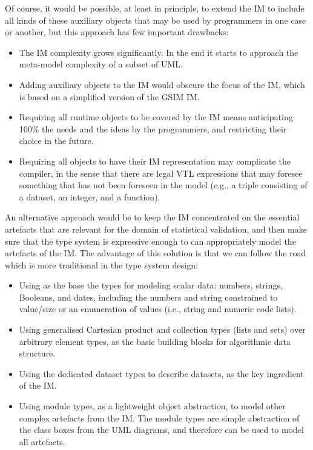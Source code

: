 \documentclass[droidmono,libertine,twoside,user,unofficial]{ecarticle}
\begin{document}
Of course, it would be possible, at least in principle, to extend the
IM to include all kinds of these auxiliary objects that may be used by
programmers in one case or another, but this approach has few
important drawbacks:
\begin{itemize}
\item The IM complexity grows significantly.  In the end it starts to
  approach the meta-model complexity of a subset of UML.
\item Adding auxiliary objects to the IM would obscure the focus of
  the IM, which is based on a simplified version of the GSIM IM.
\item Requiring all runtime objects to be covered by the IM means
  anticipating 100\% the needs and the ideas by the programmers, and
  restricting their choice in the future.
\item Requiring all objects to have their IM representation may
  complicate the compiler, in the sense that there are legal VTL
  expressions that may foresee something that has not been foreseen in
  the model (e.g., a triple consisting of a dataset, an integer, and a
  function).
\end{itemize}

An alternative approach would be to keep the IM concentrated on the
essential artefacts that are relevant for the domain of statistical
validation, and then make sure that the type system is expressive
enough to can appropriately model the artefacts of the IM.
%
The advantage of this solution is that we can follow the road which is
more traditional in the type system design:
\begin{itemize}
\item Using as the base the types for modeling scalar data: numbers,
  strings, Booleans, and dates, including the numbers and string
  constrained to value/size or an enumeration of values (i.e., string
  and numeric code lists).
  
\item Using generalised Cartesian product and collection types (lists
  and sets) over arbitrary element types, as the basic building blocks
  for algorithmic data structure.
  
\item Using the dedicated dataset types to describe datasets, as the
  key ingredient of the IM.

\item Using module types, as a lightweight object abstraction, to
  model other complex artefacts from the IM.  The module types are
  simple abstraction of the class boxes from the UML diagrams, and
  therefore can be used to model all artefacts.
\end{itemize}
\end{document}
